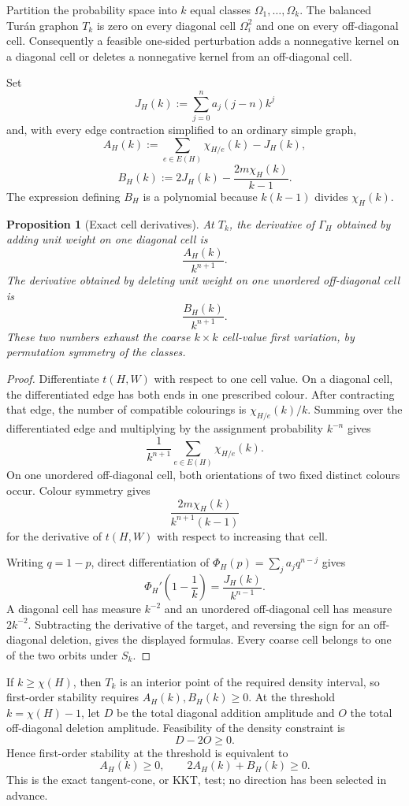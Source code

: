\documentclass[11pt]{article}
\newtheorem{proposition}[theorem]{Proposition}
\begin{document}
Partition the probability space into $k$ equal classes
$\Omega_1,\ldots,\Omega_k$.  The balanced Tur\'an graphon $T_k$ is zero
on every diagonal cell $\Omega_i^2$ and one on every off-diagonal cell.
Consequently a feasible one-sided perturbation adds a nonnegative kernel on
a diagonal cell or deletes a nonnegative kernel from an off-diagonal cell.

Set
\[
 J_H(k):=\sum_{j=0}^n a_j(j-n)k^j
\]
and, with every edge contraction simplified to an ordinary simple graph,
\[
 A_H(k):=\sum_{e\in E(H)}\chi_{H/e}(k)-J_H(k),
\]
\[
 B_H(k):=2J_H(k)-\frac{2m\chi_H(k)}{k-1}.
\]
The expression defining $B_H$ is a polynomial because
$k(k-1)$ divides $\chi_H(k)$.

\begin{proposition}[Exact cell derivatives]\label{prop:first}
At $T_k$, the derivative of $\Gamma_H$ obtained by adding unit weight on
one diagonal cell is
\[
 \frac{A_H(k)}{k^{n+1}}.
\]
The derivative obtained by deleting unit weight on one unordered
off-diagonal cell is
\[
 \frac{B_H(k)}{k^{n+1}}.
\]
These two numbers exhaust the coarse $k\times k$ cell-value first
variation, by permutation symmetry of the classes.
\end{proposition}

\begin{proof}
Differentiate $t(H,W)$ with respect to one cell value.  On a diagonal cell,
the differentiated edge has both ends in one prescribed colour.  After
contracting that edge, the number of compatible colourings is
$\chi_{H/e}(k)/k$.  Summing over the differentiated edge and multiplying by
the assignment probability $k^{-n}$ gives
\[
 \frac1{k^{n+1}}\sum_{e\in E(H)}\chi_{H/e}(k).
\]
On one unordered off-diagonal cell, both orientations of two fixed distinct
colours occur.  Colour symmetry gives
\[
 \frac{2m\chi_H(k)}{k^{n+1}(k-1)}
\]
for the derivative of $t(H,W)$ with respect to increasing that cell.

Writing $q=1-p$, direct differentiation of
$\Phi_H(p)=\sum_j a_jq^{n-j}$ gives
\[
 \Phi_H'\!\left(1-\frac1k\right)
 =\frac{J_H(k)}{k^{n-1}}.
\]
A diagonal cell has measure $k^{-2}$ and an unordered off-diagonal cell has
measure $2k^{-2}$.  Subtracting the derivative of the target, and reversing
the sign for an off-diagonal deletion, gives the displayed formulas.
Every coarse cell belongs to one of the two orbits under $S_k$.
\end{proof}

If $k\geq\chi(H)$, then $T_k$ is an interior point of the required density
interval, so first-order stability requires $A_H(k),B_H(k)\geq0$.  At the
threshold $k=\chi(H)-1$, let $D$ be the total diagonal addition amplitude
and $O$ the total off-diagonal deletion amplitude.  Feasibility of the
density constraint is
\[
 D-2O\geq0.
\]
Hence first-order stability at the threshold is equivalent to
\begin{equation}
 A_H(k)\geq0,
 \qquad
 2A_H(k)+B_H(k)\geq0.
 \label{eq:threshold-kkt}
\end{equation}
This is the exact tangent-cone, or KKT, test; no direction has been selected
in advance.
\end{document}

